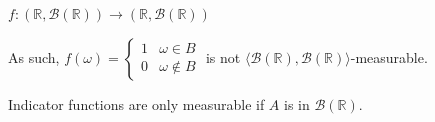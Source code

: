 \documentclass[12pt,letterpaper, onecolumn]{exam}
\newcommand{\real}{\mathbb{R}}
\newcommand{\tribrac}[1]{\langle #1 \rangle}
\newcommand{\borel}{\mathcal{B}(\mathbb{R})}
\begin{document}
\begin{questions}
\begin{solution}
    $f: (\real, \borel) \to (\real, \borel)$ 

    As such, 
    $f(\omega) = \begin{cases}
        1 & \omega \in B \\
        0 & \omega \notin B
    \end{cases}$  
    is not $\tribrac{\borel, \borel}$-measurable.

    Indicator functions are only measurable if $A$ is in $\borel.$
    \end{solution}
    
\end{questions}
\end{document}
